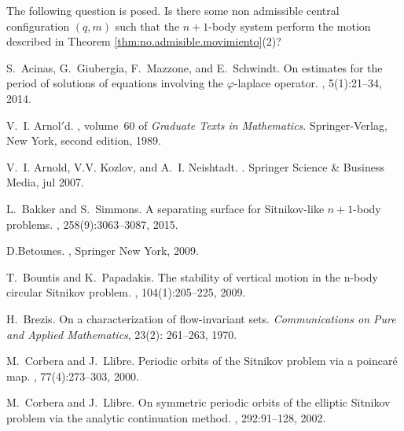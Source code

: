 \documentclass[smallcondensed]{svjour3}
\begin{document}
\begin{remark}
 The following question is posed. Is there some non admissible central configuration $(q,m)$ such that the $n+1$-body system perform the motion described in Theorem \ref{thm:no.admisible.movimiento}(2)?
\end{remark}




\def\cprime{$'$}
\begin{thebibliography}{10}

S.~Acinas, G.~Giubergia, F.~Mazzone, and E.~Schwindt.
\newblock On estimates for the period of solutions of equations involving the
  $\varphi$-laplace operator.
,
  5(1):21--34, 2014.

V.~I. Arnol{\cprime}d.
, volume~60 of {\em
  Graduate Texts in Mathematics}.
\newblock Springer-Verlag, New York, second edition, 1989.

V.~I. Arnold, V.V. Kozlov, and A.~I. Neishtadt.
.
\newblock Springer Science \& Business Media, jul 2007.

L.~Bakker and S.~Simmons.
\newblock A separating surface for {S}itnikov-like $n+ 1$-body problems.
, 258(9):3063--3087, 2015.

D.Betounes.
,
\newblock Springer New York, 2009.



T.~Bountis and K.~Papadakis.
\newblock The stability of vertical motion in the n-body circular {S}itnikov
  problem.
, 104(1):205--225,
  2009.


 H.~Brezis.
\newblock On a characterization of flow-invariant sets.
\newblock
{\em Communications on Pure and Applied Mathematics}, 23(2): 261--263, 1970.


M.~Corbera and J.~Llibre.
\newblock Periodic orbits of the {S}itnikov problem via a poincar{\'e} map.
, 77(4):273--303,
  2000.

M.~Corbera and J.~Llibre.
\newblock On symmetric periodic orbits of the elliptic {S}itnikov problem via
  the analytic continuation method.
, 292:91--128, 2002.


\end{thebibliography}
\end{document}
